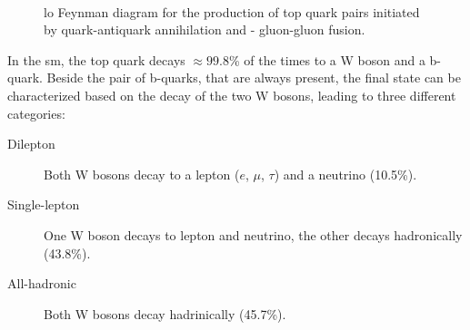 \begin{figure}[h]
\centering 
{}\\
\caption{\Gls{lo} Feynman diagram for the production of top quark pairs initiated by  quark-antiquark annihilation and - gluon-gluon fusion.}\label{fig:ttbar_prod}
\end{figure}

In the \gls{sm}, the top quark decays $\approx 99.8$\% of the times to a W boson and a b-quark. 
Beside the pair of b-quarks, that are always present, the final state can be characterized based on the decay of the two W bosons, leading to three different categories:
\begin{description}
\item[Dilepton]  Both W bosons decay to a lepton ($e$, $\mu$, $\tau$) and a neutrino (10.5\%).
\item[Single-lepton] One W boson decays to lepton and neutrino, the other decays hadronically (43.8\%).
\item[All-hadronic] Both W bosons decay hadrinically (45.7\%).
\end{description}

